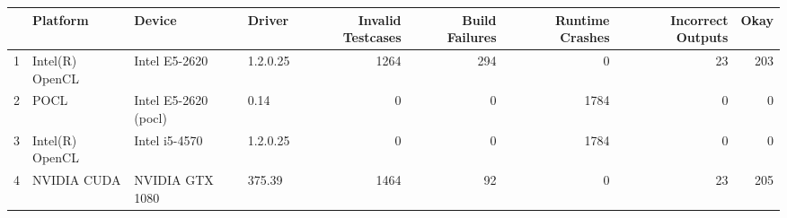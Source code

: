 \begin{tabular}{llllrrrrr}
\toprule
{} &         Platform &                Device &    Driver &  Invalid Testcases &  Build Failures &  Runtime Crashes &  Incorrect Outputs &  Okay \\
\midrule
1 &  Intel(R) OpenCL &         Intel E5-2620 &  1.2.0.25 &               1264 &             294 &                0 &                 23 &   203 \\
2 &             POCL &  Intel E5-2620 (pocl) &      0.14 &                  0 &               0 &             1784 &                  0 &     0 \\
3 &  Intel(R) OpenCL &         Intel i5-4570 &  1.2.0.25 &                  0 &               0 &             1784 &                  0 &     0 \\
4 &      NVIDIA CUDA &       NVIDIA GTX 1080 &    375.39 &               1464 &              92 &                0 &                 23 &   205 \\
\bottomrule
\end{tabular}

